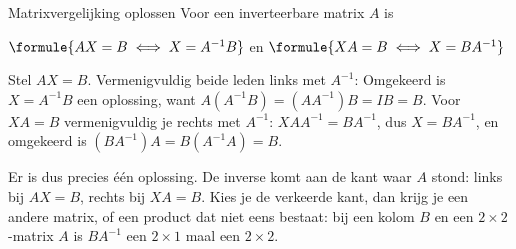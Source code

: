 \begin{theorie}
\begin{stelling}{Matrixvergelijking oplossen}
Voor een inverteerbare matrix $A$ is

\vspace{1mm}
\qquad $\formule{AX = B \iff X = A^{-1}B}$ \qquad en \qquad $\formule{XA = B \iff X = BA^{-1}}$
\end{stelling}

\begin{bewijs}
Stel $AX = B$. Vermenigvuldig beide leden links met $A^{-1}$:
Omgekeerd is $X = A^{-1}B$ een oplossing, want $A(A^{-1}B) = (AA^{-1})B = IB = B$. Voor $XA = B$ vermenigvuldig je rechts met $A^{-1}$: $XAA^{-1} = BA^{-1}$, dus $X = BA^{-1}$, en omgekeerd is $(BA^{-1})A = B(A^{-1}A) = B$.
\end{bewijs}
\end{theorie}

Er is dus precies één oplossing. De inverse komt aan de kant waar $A$ stond: links bij $AX = B$, rechts bij $XA = B$. Kies je de verkeerde kant, dan krijg je een andere matrix, of een product dat niet eens bestaat: bij een kolom $B$ en een $2 \times 2$-matrix $A$ is $BA^{-1}$ een $2 \times 1$ maal een $2 \times 2$.


